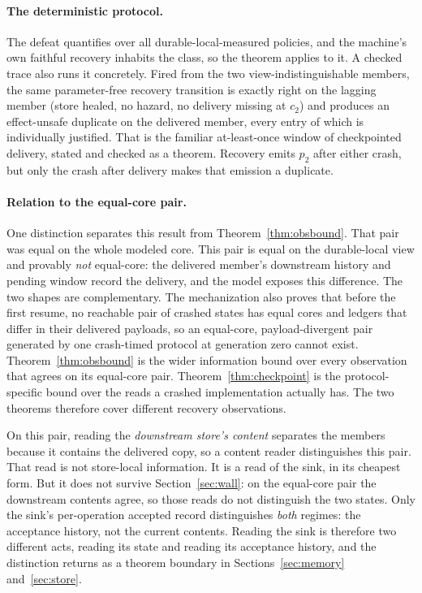 \documentclass[sigplan,10pt]{acmart}
\theoremstyle{plain}
\theoremstyle{definition}
\begin{document}
\paragraph{The deterministic protocol.}
The defeat quantifies over all durable-local-measured policies, and the
machine's own faithful recovery inhabits the class, so the theorem
applies to it. A checked trace also runs it concretely. Fired from
the two view-indistinguishable members, the same parameter-free
recovery transition is exactly right on the lagging member (store
healed, no hazard, no delivery missing at $c_2$) and produces an effect-unsafe
duplicate on the delivered member, every entry of which is individually
justified. That is the familiar at-least-once window of checkpointed
delivery, stated and checked as a theorem. Recovery emits $p_2$ after
either crash, but only the crash after delivery makes that emission a
duplicate.

\paragraph{Relation to the equal-core pair.}
One distinction separates this result from
Theorem~\ref{thm:obsbound}. That pair was equal on the whole modeled
core. This pair is equal on the durable-local view and provably
\emph{not} equal-core: the delivered member's downstream history and
pending window record the delivery, and the model exposes this
difference. The two shapes are complementary. The mechanization also
proves that before the first
resume, no reachable pair of crashed states has equal cores and
ledgers that differ in their delivered payloads, so an equal-core,
payload-divergent pair generated by one crash-timed protocol at
generation zero cannot exist. Theorem~\ref{thm:obsbound} is the
wider information bound over every observation that agrees on its
equal-core pair. Theorem~\ref{thm:checkpoint} is the protocol-specific
bound over the reads a crashed implementation actually has. The two theorems
therefore cover different recovery observations.

On this pair, reading the
\emph{downstream store's content} separates the members because it
contains the delivered copy, so a content reader distinguishes this
pair. That read is not store-local information. It
is a read of the sink, in its cheapest form. But it does
not survive Section~\ref{sec:wall}: on the equal-core pair the
downstream contents agree, so those reads do not distinguish the two states.
Only the sink's per-operation accepted record distinguishes
\emph{both} regimes: the acceptance history, not the current contents.
Reading the sink is therefore two different acts, reading its state
and reading its acceptance history, and the distinction returns as a
theorem boundary in Sections~\ref{sec:memory} and~\ref{sec:store}.
\end{document}

